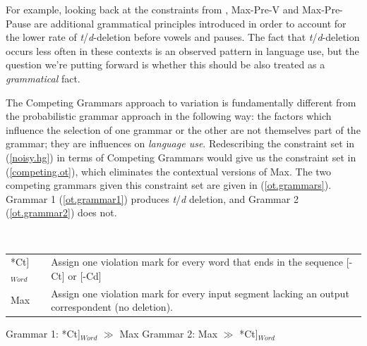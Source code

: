For example, looking back at the constraints from \citet{Coetzee2012}, {\sc Max-Pre-V} and {\sc Max-Pre-Pause} are additional grammatical principles introduced in order to account for the lower rate of {\sl t}/{\sl d}-deletion before vowels and pauses.
The fact that {\sl t}/{\sl d}-deletion occurs less often in these contexts is an observed pattern in language use, but the question we're putting forward is whether this should be also treated as a \emph{grammatical} fact.

The Competing Grammars approach to variation is fundamentally different from the probabilistic grammar approach in the following way: the factors which influence the selection of one grammar or the other are not themselves part of the grammar; they are influences on \textsl{language use}.
Redescribing the constraint set in (\ref{noisy.hg}) in terms of Competing Grammars would give us the constraint set in (\ref{competing.ot}), which eliminates the contextual versions of {\sc Max}.
The two competing grammars given this constraint set are given in (\ref{ot.grammars}).
Grammar 1 (\ref{ot.grammar1}) produces {\sl t}/{\sl d} deletion, and Grammar 2 (\ref{ot.grammar2}) does not.
\begin{exe}
	\ex \label{competing.ot}\ \\
	\begin{tabular}{lp{3in}}
	*{\sc Ct}]$_{Word}$& Assign one violation mark for every word that ends in the sequence [-Ct] or [-Cd]\\
	{\sc Max} & Assign one violation mark for every input segment lacking an output correspondent (no deletion).
	\end{tabular}
	\ex \label{ot.grammars}
		\begin{xlist}
			\ex Grammar 1: *{\sc Ct}]$_{Word}$ $\gg$ {\sc Max} \label{ot.grammar1}
			\ex Grammar 2: {\sc Max} $\gg$ *{\sc Ct}]$_{Word}$ \label{ot.grammar2}
		\end{xlist}
\end{exe}

